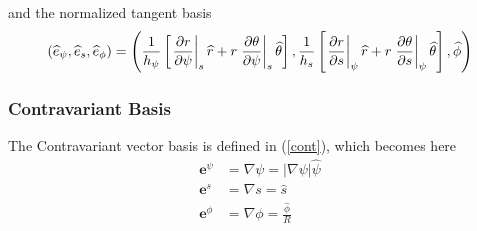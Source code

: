 and the normalized tangent basis 
\begin{equation}
\left( \widehat{e}_{\psi},\widehat{e}_{s},\widehat{e}_{\phi}\right) =\left( 
\frac{1}{h_{\psi}}\left[ \left. \frac{\partial r}{\partial\psi}\right| _{s}%
\widehat{r}+r\left. \frac{\partial\theta}{\partial\psi}\right| _{s}\widehat{%
\theta}\right] ,\frac{1}{h_{s}}\left[ \left. \frac{\partial r}{\partial s}%
\right| _{\psi}\widehat{r}+r\left. \frac{\partial\theta }{\partial s}\right|
_{\psi}\widehat{\theta}\right] ,\widehat{\phi}\right)
\end{equation}

\subsubsection{Contravariant Basis}

The Contravariant vector basis is defined in (\ref{cont}), which becomes
here 
\begin{align}
\mathbf{e}^{\psi} & =\nabla\psi=\left| \nabla\psi\right| \widehat{\psi} \\
\mathbf{e}^{s} & =\nabla s=\widehat{s} \\
\mathbf{e}^{\phi} & =\nabla\phi=\frac{\widehat{\phi}}{R}
\end{align}

